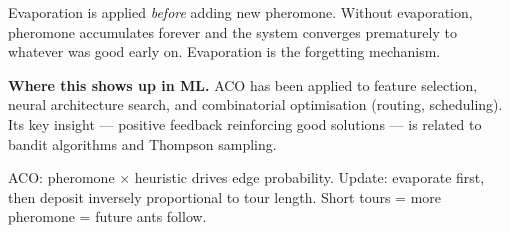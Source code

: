\documentclass[a4paper,11pt]{article}
\begin{document}
\begin{watchout}
Evaporation is applied \emph{before} adding new pheromone. Without evaporation, pheromone accumulates forever and the system converges prematurely to whatever was good early on. Evaporation is the forgetting mechanism.
\end{watchout}

\textbf{Where this shows up in ML.} ACO has been applied to feature selection, neural architecture search, and combinatorial optimisation (routing, scheduling). Its key insight — positive feedback reinforcing good solutions — is related to bandit algorithms and Thompson sampling.

\begin{keytake}
ACO: pheromone $\times$ heuristic drives edge probability. Update: evaporate first, then deposit inversely proportional to tour length. Short tours = more pheromone = future ants follow.
\end{keytake}
\end{document}
